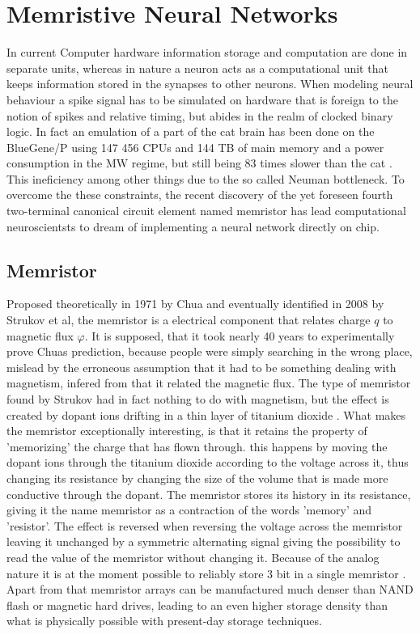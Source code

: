 \documentclass{SeminarV2}
\begin{document}
\section{Memristive Neural Networks}
In current Computer hardware information storage and computation are done in separate units, whereas in nature a neuron acts as a computational unit that keeps information stored in the synapses to other neurons. When modeling neural behaviour a spike signal has to be simulated on hardware that is foreign to the notion of spikes and relative timing, but abides in the realm of clocked binary logic. In fact an emulation of a part of the cat brain has been done on the BlueGene/P using 147 456 CPUs and 144 TB of main memory and a power consumption in the MW regime, but still being 83 times slower than the cat \cite{jo_nanoscale_2010}. This ineficiency among other things due to the so called Neuman bottleneck\cite{jo_nanoscale_2010}. To overcome the these constraints, the recent discovery of the yet foreseen \cite{chua_memristor-missing_1971} fourth two-terminal canonical circuit element named memristor has lead computational neuroscientsts to dream of implementing a neural network directly on chip.

\subsection{Memristor}
Proposed theoretically in 1971 by Chua \cite{chua_memristor-missing_1971} and eventually identified in 2008 by Strukov et al, the memristor is a electrical component that relates charge $q$ to magnetic flux $\varphi$. It is supposed, that it took nearly 40 years to experimentally prove Chuas prediction, because people were simply searching in the wrong place, mislead by the erroneous assumption that it had to be something dealing with magnetism, infered from that it related the magnetic flux.
The type of memristor found by Strukov had in fact nothing to do with magnetism, but the effect is created by dopant ions drifting in a thin layer of titanium dioxide \cite{strukov_missing_2008}.
What makes the memristor exceptionally interesting, is that it retains the property of 'memorizing' the charge that has flown through. this happens by moving the dopant ions through the titanium dioxide according to the voltage across it, thus changing its resistance by changing the size of the volume that is made more conductive through the dopant. The memristor stores its history in its resistance, giving it the name memristor as a contraction of the words 'memory' and 'resistor'.
The effect is reversed when reversing the voltage across the memristor leaving it unchanged by a symmetric alternating signal giving the possibility to read the value of the memristor without changing it.
Because of the analog nature it is at the moment possible to reliably store 3 bit in a single memristor \cite{nima_taherinejad_memristors_????}. Apart from that memristor arrays can be manufactured much denser than  NAND flash or magnetic hard drives, leading to an even higher storage density than what is physically possible with present-day storage techniques.
\end{document}
